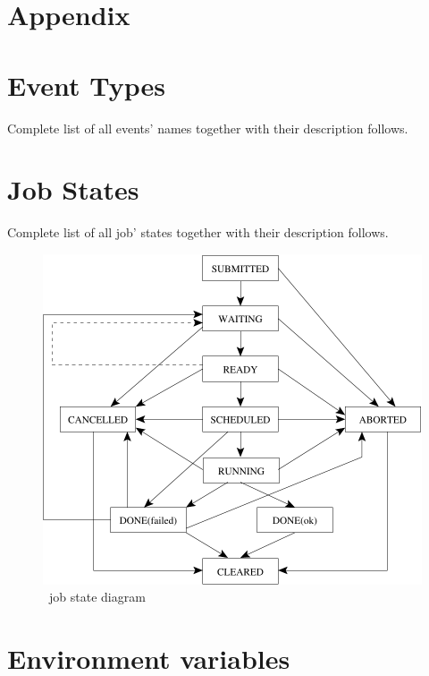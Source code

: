 %
%
\section*{Appendix}

\section{\LB Event Types}
\label{a:events}
Complete list of all events' names together with their description follows.


\newpage
\section{\LB Job States}
\label{a:jobstat}
Complete list of all job' states together with their description follows.


\begin{figure}[h]
\centering
\includegraphics[width=.6\hsize]{images/wms2-jobstat}
\caption{\LB\ job state diagram}
\end{figure}

\newpage
\section{Environment variables}
\label{a:environment}

